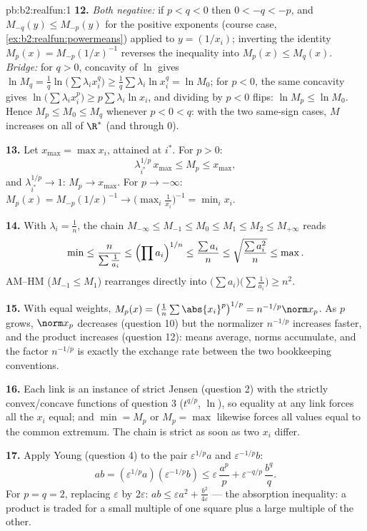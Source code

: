 \begin{solution}{pb:b2:realfun:1}
\textbf{12.} \emph{Both negative:} if $p < q < 0$ then $0 < -q <
-p$, and $M_{-q}(y) \leq M_{-p}(y)$ for the positive exponents
(course case, \cref{ex:b2:realfun:powermeans}) applied to $y =
(1/x_i)$; inverting the identity $M_p(x) = M_{-p}(1/x)^{-1}$
reverses the inequality into $M_p(x) \leq M_q(x)$.
\emph{Bridge:} for $q > 0$, concavity of $\ln$ gives $\ln M_q =
\frac1q\ln\bigl(\sum\lambda_ix_i^q\bigr) \geq
\frac1q\sum\lambda_i\ln x_i^q = \ln M_0$; for $p < 0$, the same
concavity gives $\ln\bigl(\sum\lambda_ix_i^p\bigr) \geq
p\sum\lambda_i\ln x_i$, and dividing by $p < 0$ flips: $\ln M_p
\leq \ln M_0$. Hence $M_p \leq M_0 \leq M_q$ whenever $p < 0 <
q$: with the two same-sign cases, $M$ increases on all of
$\R^*$ (and through $0$).

\textbf{13.} Let $x_{\max} = \max x_i$, attained at $i^*$. For
$p > 0$:
\[
\lambda_{i^*}^{1/p}\,x_{\max} \leq M_p \leq x_{\max},
\]
and $\lambda_{i^*}^{1/p} \to 1$: $M_p \to x_{\max}$. For $p \to
-\infty$: $M_p(x) = M_{-p}(1/x)^{-1} \to
\bigl(\max_i\frac1{x_i}\bigr)^{-1} = \min_ix_i$.

\textbf{14.} With $\lambda_i = \frac1n$, the chain $M_{-\infty}
\leq M_{-1} \leq M_0 \leq M_1 \leq M_2 \leq M_{+\infty}$ reads
\[
\min \leq \frac{n}{\sum\frac1{a_i}} \leq \Bigl(\prod
a_i\Bigr)^{1/n} \leq \frac{\sum a_i}{n} \leq
\sqrt{\frac{\sum a_i^2}{n}} \leq \max .
\]
AM--HM ($M_{-1} \leq M_1$) rearranges directly into
$\bigl(\sum a_i\bigr)\bigl(\sum\frac1{a_i}\bigr) \geq n^2$.

\textbf{15.} With equal weights, $M_p(x) =
\bigl(\frac1n\sum\abs{x_i}^p\bigr)^{1/p} = n^{-1/p}\norm x_p$.
As $p$ grows, $\norm x_p$ decreases (question 10) but the
normalizer $n^{-1/p}$ increases faster, and the product
increases (question 12): means average, norms accumulate, and
the factor $n^{-1/p}$ is exactly the exchange rate between the
two bookkeeping conventions.

\textbf{16.} Each link is an instance of strict Jensen
(question 2) with the strictly convex/concave functions of
question 3 ($t^{q/p}$, $\ln$), so equality at any link forces
all the $x_i$ equal; and $\min = M_p$ or $M_p = \max$ likewise
forces all values equal to the common extremum. The chain is
strict as soon as two $x_i$ differ.

\textbf{17.} Apply Young (question 4) to the pair
$\varepsilon^{1/p}a$ and $\varepsilon^{-1/p}b$:
\[
ab = (\varepsilon^{1/p}a)(\varepsilon^{-1/p}b)
\leq \varepsilon\,\frac{a^p}p +
\varepsilon^{-q/p}\,\frac{b^q}q .
\]
For $p = q = 2$, replacing $\varepsilon$ by $2\varepsilon$:
$ab \leq \varepsilon a^2 + \frac{b^2}{4\varepsilon}$ --- the
absorption inequality: a product is traded for a small multiple
of one square plus a large multiple of the other.


\end{solution}
